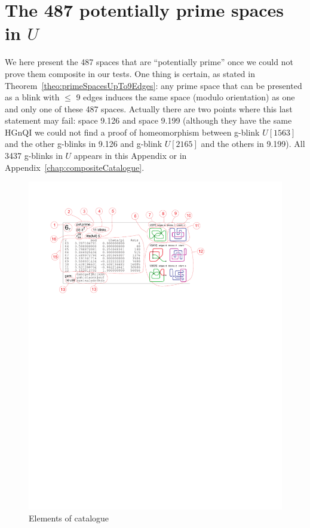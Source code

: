 \chapter{The 487 potentially prime spaces in $U$}
\label{chap:primeCatalogue}

We here present the 487 spaces that are ``potentially prime'' once we could
not prove them composite in our tests. One thing is certain, as stated in
Theorem~\ref{theo:primeSpacesUpTo9Edges}: any prime space that can be
presented as a blink with $\leq$ 9 edges induces the same space (modulo
orientation) as one and only one of these 487 spaces. Actually there
are two points where this last statement may fail: space 9.126 and space 9.199 (although
they have the same HGnQI we could not find a proof of homeomorphism
between g-blink $U[1563]$ and the other g-blinks in 9.126 and g-blink $U[2165]$
and the others in 9.199). All 3437 g-blinks in $U$ appears in this Appendix or
in Appendix~\ref{chap:compositeCatalogue}.

\begin{figure}[htp]
   \begin{center}
      \leavevmode
      \includegraphics[width=14.5cm]{fig/catalogueExplanation.pdf}
   \end{center}
   \vspace{-0.7cm}
   \caption{ Elements of catalogue}
   \label{fig:catalogueExplanation}
\end{figure}

